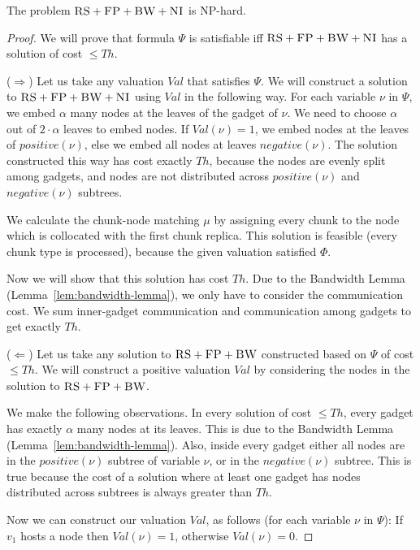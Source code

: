 \documentclass[9pt]{sigcomm-alternate}
\newcommand{\carlo}[1]{\textcolor{red}{carlo: #1}}
\newcommand{\variab}{\nu}
\newcommand{\clauses}{\alpha}
\newcommand{\CC}{\textsc{NI}}
\newcommand{\FP}{\textsc{FP}}
\newcommand{\RS}{\textsc{RS}}
\newcommand{\BW}{\textsc{BW}}
\newcommand{\Formula}{\ensuremath{\Psi}}
\newcommand{\Thr}{\ensuremath{Th}}
\newcommand{\positive}{\ensuremath{positive}}
\newcommand{\negative}{\ensuremath{negative}}
\newcommand{\Val}{\ensuremath{Val}}
\begin{document}
\begin{appendix}
\begin{theorem}
The problem $\RS+\FP+\BW+\CC$ is NP-hard.
\end{theorem}
\begin{proof}
We will prove that formula $\Formula$ is satisfiable iff $\RS+\FP+\BW+\CC$ has
a solution of cost $\leq \Thr$.

($\Rightarrow$) Let us take any valuation $\Val$ that satisfies $\Formula$.
We will construct a solution to $\RS+\FP+\BW+\CC$ using $\Val$ in the following
way.
For each variable $\variab$ in $\Formula$, we embed $\clauses$ many nodes
at the  leaves of the gadget of $\variab$. We need to choose $\clauses$ out of
$2 \cdot \clauses$ leaves to embed nodes. If $\Val(\variab) = 1$, we embed
nodes at the leaves
of $\positive(\variab)$, else we embed all nodes at leaves $\negative(\variab)$.
The solution constructed this way has cost exactly
$\Thr$, because the nodes are evenly split among gadgets, and nodes are not
distributed across $\positive(\variab)$ and $\negative(\variab)$ subtrees.

We calculate the chunk-node matching $\mu$ by assigning every chunk to
the node which is collocated with the first chunk replica. This solution is feasible
(every chunk type is processed),
because the given valuation satisfied $\Phi$.

Now we will show that this solution has cost $\Thr$.
Due to the Bandwidth Lemma (Lemma~\ref{lem:bandwidth-lemma}),
we only have to consider the communication cost. We sum inner-gadget communication and communication among gadgets to get exactly $\Thr$.

($\Leftarrow$) Let us take any solution to $\RS+\FP+\BW$ constructed based on $\Formula$ of cost $\leq \Thr$.
We will construct a positive valuation $\Val$ by considering the nodes in
the solution to $\RS+\FP+\BW$.

We make the following observations. In every solution of cost
$\leq \Thr$, every gadget has exactly $\clauses$ many nodes
at its leaves. This is due to the Bandwidth Lemma (Lemma~\ref{lem:bandwidth-lemma}).
Also, inside
every gadget either all nodes are in the $\positive(\variab)$ subtree
of variable $\variab$, or in the $\negative(\variab)$ subtree. This is true
because the cost of a solution where at least one gadget has nodes
distributed across subtrees is
always greater than $\Thr$.

Now we can construct our valuation $\Val$, as follows
(for each variable $\variab$ in $\Formula$):
If $v_1$ hosts a node then $\Val(\variab) = 1$,
otherwise $\Val(\variab) = 0$.


\end{proof}
\end{appendix}
\end{document}
